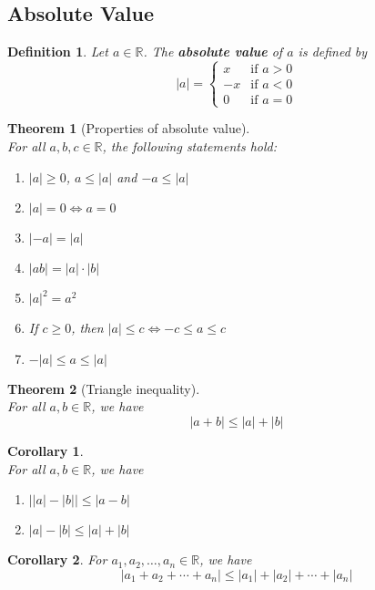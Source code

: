 \documentclass[8pt]{article}
\newtheorem{definition}{Definition}[section]
\newtheorem{theorem}{Theorem}[section]
\newtheorem{corollary}{Corollary}[section]
\theoremstyle{definition}
\begin{document}
\subsection{Absolute Value}
\begin{definition}\normalfont Let $a\in\mathbb{R}$. The \textbf{absolute value} of $a$ is defined by
\begin{equation*}
|a|=\begin{cases}
x &\text{if } a> 0\\
-x &\text{if } a<0\\
0 &\text{if }a=0
\end{cases}
\end{equation*}
\end{definition}
\begin{theorem}[Properties of absolute value]\hfill\\
\normalfont For all $a,b,c\in\mathbb{R}$, the following statements hold:
\begin{enumerate}[label=(\roman*)]
\item $|a|\geq 0$, $a\leq |a|$ and $-a\leq |a|$
\item $|a|=0\Leftrightarrow a=0$
\item $|-a|=|a|$
\item $|ab|=|a|\cdot|b|$
\item $|a|^2 = a^2$
\item If $c\geq 0$, then $|a|\leq c\Leftrightarrow -c\leq a\leq c$
\item $-|a|\leq a\leq|a|$
\end{enumerate}
\end{theorem}
\begin{theorem}[Triangle inequality]
\hfill\\
\normalfont For all $a,b\in\mathbb{R}$, we have
\[
|a+b|\leq |a|+|b|
\]
\end{theorem}
\begin{corollary}
\hfill\\
\normalfont For all $a,b\in\mathbb{R}$, we have
\begin{enumerate}[label=(\roman*)]
\item $\bigl\lvert\lvert a\rvert -\lvert b\rvert \bigr\rvert\leq|a-b|$
\item $\lvert a\rvert -\lvert b\rvert \leq|a|+|b|$
\end{enumerate}
\end{corollary}
\begin{corollary}\normalfont For $a_1,a_2,\ldots,a_n\in\mathbb{R}$, we have
\[
|a_1+a_2+\cdots+a_n|\leq|a_1|+|a_2|+\cdots+|a_n|
\]
\end{corollary}
\clearpage
\end{document}
